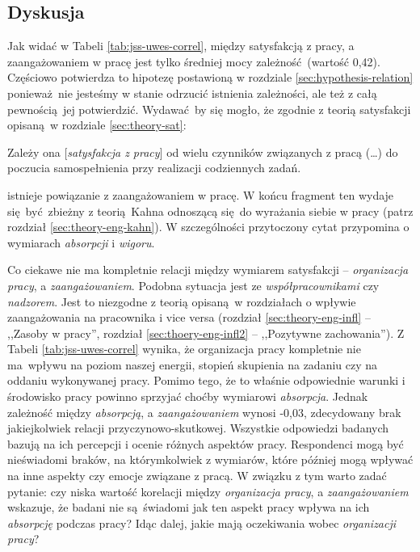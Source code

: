 \subsection{Dyskusja}
Jak widać w Tabeli \ref{tab:jss-uwes-correl}, między satysfakcją z pracy, a zaangażowaniem w pracę jest tylko średniej mocy zależność (wartość 0,42). Częściowo potwierdza to hipotezę postawioną w rozdziale \ref{sec:hypothesis-relation} ponieważ nie jesteśmy w stanie odrzucić istnienia zależności, ale też z całą pewnością jej potwierdzić. Wydawać by się mogło, że zgodnie z teorią satysfakcji opisaną w rozdziale \ref{sec:theory-sat}:

\begin{iquote}
  Zależy ona [\textit{satysfakcja z pracy}] od wielu czynników związanych z pracą (\ldots) do poczucia samospełnienia przy realizacji codziennych zadań. \cite[str. 296]{SchultzSat}
\end{iquote}

istnieje powiązanie z zaangażowaniem w pracę. W końcu fragment ten wydaje się być zbieżny z teorią Kahna odnoszącą się do wyrażania siebie w pracy (patrz rozdział \ref{sec:theory-eng-kahn}). W szczególności przytoczony cytat przypomina o wymiarach \textit{absorpcji} i \textit{wigoru}. 

Co ciekawe nie ma kompletnie relacji między wymiarem satysfakcji -- \textit{organizacja pracy}, a \textit{zaangażowaniem}. Podobna sytuacja jest ze \textit{współpracownikami} czy \textit{nadzorem}. Jest to niezgodne z teorią opisaną w rozdziałach o wpływie zaangażowania na pracownika i vice versa (rozdział \ref{sec:theory-eng-infl} -- ,,Zasoby w pracy'', rozdział \ref{sec:thoery-eng-infl2} -- ,,Pozytywne zachowania''). Z Tabeli
\ref{tab:jss-uwes-correl} wynika, że organizacja pracy kompletnie nie ma wpływu na poziom naszej energii, stopień skupienia na zadaniu czy na oddaniu
wykonywanej pracy. Pomimo tego, że to właśnie odpowiednie warunki i środowisko pracy powinno sprzyjać choćby wymiarowi \textit{absorpcja}. Jednak zależność między \textit{absorpcją}, a \textit{zaangażowaniem} wynosi
-0,03, zdecydowany brak jakiejkolwiek relacji przyczynowo-skutkowej. Wszystkie odpowiedzi badanych bazują na ich percepcji i ocenie różnych aspektów pracy. Respondenci mogą być nieświadomi braków, na którymkolwiek z wymiarów, które później mogą wpływać na inne aspekty czy emocje związane z pracą. W związku z tym warto zadać pytanie: czy niska wartość korelacji między \textit{organizacja pracy}, a \textit{zaangażowaniem} wskazuje, że badani nie są świadomi jak ten aspekt pracy wpływa na ich \textit{absorpcję} podczas pracy? Idąc dalej, jakie mają oczekiwania wobec
\textit{organizacji pracy}?

